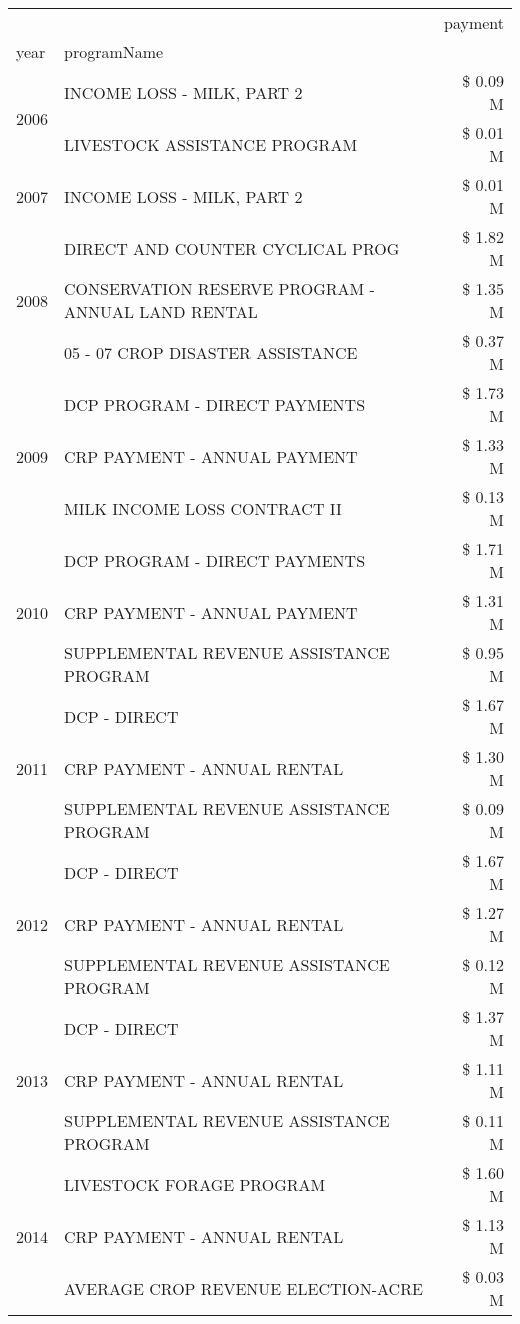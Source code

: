 \begin{tabular}{llr}
\toprule
 &  & payment \\
year & programName &  \\
\midrule
\multirow[t]{2}{*}{2006} & INCOME LOSS - MILK, PART 2 & \$ 0.09 M \\
 & LIVESTOCK ASSISTANCE PROGRAM & \$ 0.01 M \\
\cline{1-3}
2007 & INCOME LOSS - MILK, PART 2 & \$ 0.01 M \\
\cline{1-3}
\multirow[t]{3}{*}{2008} & DIRECT AND COUNTER CYCLICAL PROG & \$ 1.82 M \\
 & CONSERVATION RESERVE PROGRAM - ANNUAL LAND RENTAL & \$ 1.35 M \\
 & 05 - 07 CROP DISASTER ASSISTANCE & \$ 0.37 M \\
\cline{1-3}
\multirow[t]{3}{*}{2009} & DCP PROGRAM - DIRECT PAYMENTS & \$ 1.73 M \\
 & CRP PAYMENT - ANNUAL PAYMENT & \$ 1.33 M \\
 & MILK INCOME LOSS CONTRACT II & \$ 0.13 M \\
\cline{1-3}
\multirow[t]{3}{*}{2010} & DCP PROGRAM - DIRECT PAYMENTS & \$ 1.71 M \\
 & CRP PAYMENT - ANNUAL PAYMENT & \$ 1.31 M \\
 & SUPPLEMENTAL REVENUE ASSISTANCE PROGRAM & \$ 0.95 M \\
\cline{1-3}
\multirow[t]{3}{*}{2011} & DCP - DIRECT & \$ 1.67 M \\
 & CRP PAYMENT - ANNUAL RENTAL & \$ 1.30 M \\
 & SUPPLEMENTAL REVENUE ASSISTANCE PROGRAM & \$ 0.09 M \\
\cline{1-3}
\multirow[t]{3}{*}{2012} & DCP - DIRECT & \$ 1.67 M \\
 & CRP PAYMENT - ANNUAL RENTAL & \$ 1.27 M \\
 & SUPPLEMENTAL REVENUE ASSISTANCE PROGRAM & \$ 0.12 M \\
\cline{1-3}
\multirow[t]{3}{*}{2013} & DCP - DIRECT & \$ 1.37 M \\
 & CRP PAYMENT - ANNUAL RENTAL & \$ 1.11 M \\
 & SUPPLEMENTAL REVENUE ASSISTANCE PROGRAM & \$ 0.11 M \\
\cline{1-3}
\multirow[t]{3}{*}{2014} & LIVESTOCK FORAGE PROGRAM & \$ 1.60 M \\
 & CRP PAYMENT - ANNUAL RENTAL & \$ 1.13 M \\
 & AVERAGE CROP REVENUE ELECTION-ACRE & \$ 0.03 M \\

\end{tabular}
